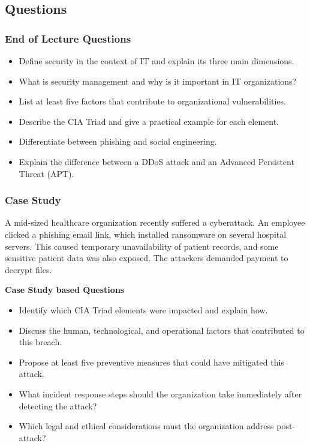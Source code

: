 \subsection{Questions}

\subsubsection{End of Lecture Questions}

\indent 

\begin{itemize}
    \item Define security in the context of IT and explain its three main dimensions.
    \item What is security management and why is it important in IT organizations?
    \item List at least five factors that contribute to organizational vulnerabilities.
    \item Describe the CIA Triad and give a practical example for each element.
    \item Differentiate between phishing and social engineering.
    \item Explain the difference between a DDoS attack and an Advanced Persistent Threat (APT).
\end{itemize}

\subsubsection{Case Study}

\indent

A mid-sized healthcare organization recently suffered a cyberattack. An employee clicked a phishing email link, which installed ransomware on several hospital servers. This caused temporary unavailability of patient records, and some sensitive patient data was also exposed. The attackers demanded payment to decrypt files.

\bigskip

\noindent\textbf{Case Study based Questions}

\begin{itemize}
    \item Identify which CIA Triad elements were impacted and explain how.
    \item Discuss the human, technological, and operational factors that contributed to this breach.
    \item Propose at least five preventive measures that could have mitigated this attack.
    \item What incident response steps should the organization take immediately after detecting the attack?
    \item Which legal and ethical considerations must the organization address post-attack?
\end{itemize}